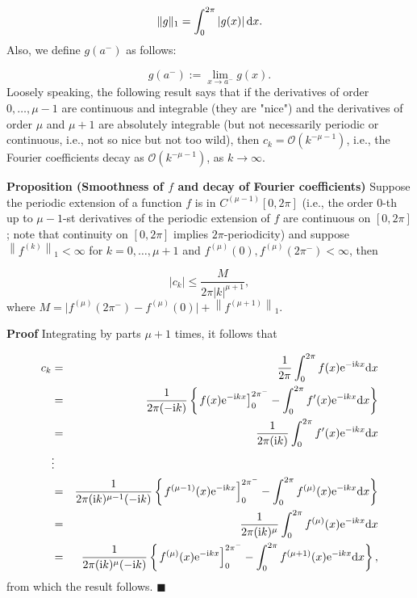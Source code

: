 \documentclass[12pt,landscape]{article}
\begin{document}
{\[
\| g \|_1 = \int_{0}^{2\pi}  \vert g(x) \vert \, {\rm d}x. 
\]
Also, we define $g(a^{-})$ as follows:

\[
g(a^{-}) :=\lim_{x\to a^{-}} g(x).
\]
Loosely speaking, the following result says that if the derivatives of order $0, \ldots, \mu-1$ are continuous and integrable (they are "nice") and the derivatives of order $\mu$ and $\mu+1$ are absolutely integrable (but not necessarily periodic or continuous, i.e., not so nice but not too wild), then $c_k = \mathcal{O}(k^{-\mu-1})$, i.e., the Fourier coefficients decay as $\mathcal{O}(k^{-\mu-1})$, as $k \to \infty$.

\textbf{Proposition (Smoothness of $f$ and decay of Fourier coefficients)} Suppose the periodic extension of a function $f$ is in $C^{(\mu-1)}[0, 2\pi]$ (i.e., the order $0$-th up to $\mu-1$-st derivatives of the periodic extension of $f$ are continuous on $[0, 2\pi]$; note that continuity on $[0, 2\pi]$ implies $2\pi$-periodicity) and suppose $\left\| f^{(k)} \right\|_{1} < \infty$ for $k = 0, \ldots, \mu+1$ and $f^{(\mu)}(0), f^{(\mu)}(2\pi^{-}) < \infty$, then

\[
\left\vert c_k   \right\vert \leq  \frac{M}{2\pi \vert k \vert^{\mu+1}},
\]
where $M =  \vert f^{(\mu)}(2\pi^{-}) - f^{(\mu)}(0)   \vert + \left\|f^{(\mu+1)}   \right\|_1$.

\textbf{Proof} Integrating by parts $\mu+1$ times, it follows that


\begin{eqnarray*}
c_k &=& \frac{1}{2\pi}\int_{0}^{2\pi}f(x) {\rm e}^{-{\rm i}kx}{\rm d}x  \\
    &=& \frac{1}{2\pi(-{\rm i}k)}\left\lbrace \left.  f(x) {\rm e}^{-{\rm i}kx}\right]_{0}^{2\pi^{-}}  - \int_{0}^{2\pi}f'(x) {\rm e}^{-{\rm i}kx} {\rm d}x \right\rbrace \\
    &=& \frac{1}{2\pi({\rm i}k)} \int_{0}^{2\pi}f'(x) {\rm e}^{-{\rm i}kx} {\rm d}x \\
    &\vdots &   \\
    & = &  \frac{1}{2\pi({\rm i}k)^{\mu-1}(-{\rm i}k)}\left\lbrace \left.  f^{(\mu-1)}(x) {\rm e}^{-{\rm i}kx}\right]_{0}^{2\pi^{-}}  - \int_{0}^{2\pi}f^{(\mu)}(x) {\rm e}^{-{\rm i}kx} {\rm d}x \right\rbrace \\
    &=& \frac{1}{2\pi({\rm i}k)^{\mu}} \int_{0}^{2\pi}f^{(\mu)}(x) {\rm e}^{-{\rm i}kx} {\rm d}x \\
    &=& \frac{1}{2\pi({\rm i}k)^{\mu}(-{\rm i}k)}\left\lbrace \left.  f^{(\mu)}(x) {\rm e}^{-{\rm i}kx}\right]_{0}^{2\pi^{-}}  - \int_{0}^{2\pi}f^{(\mu+1)}(x) {\rm e}^{-{\rm i}kx} {\rm d}x \right\rbrace,
    \end{eqnarray*}
from which the result follows. $\blacksquare$

}
\end{document}
